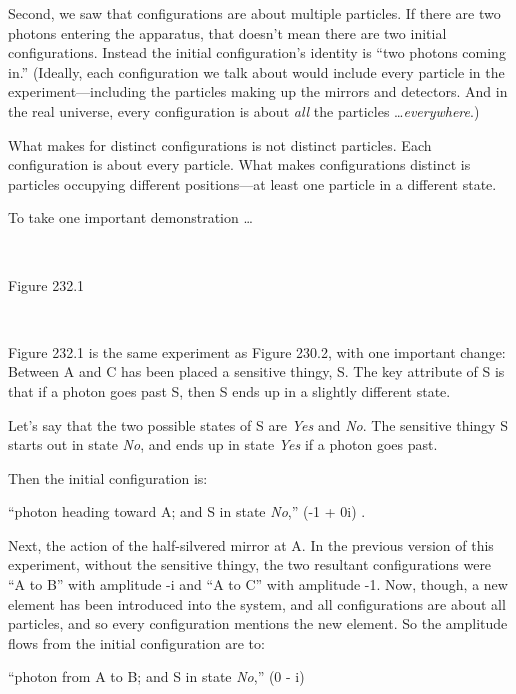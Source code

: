 {
 Second, we saw that configurations are about multiple particles.
If there are two photons entering the apparatus, that
doesn't mean there are two initial configurations.
Instead the initial configuration's identity is
``two photons coming in.'' (Ideally,
each configuration we talk about would include every particle in the
experiment---including the particles making up the mirrors and
detectors. And in the real universe, every configuration is about
\textit{all} the particles \ldots \textit{everywhere}.)}

{
 What makes for distinct configurations is not distinct particles.
Each configuration is about every particle. What makes configurations
distinct is particles occupying different positions---at least one
particle in a different state.}

{
 To take one important demonstration \ldots}

{
 ~}

{\centering
{}
 \newline
 Figure 232.1
\par}


\bigskip

{
 ~}

{
 Figure 232.1 is the same experiment as Figure 230.2, with one
important change: Between A and C has been placed a sensitive thingy,
S. The key attribute of S is that if a photon goes past S, then S ends
up in a slightly different state.}

{
 Let's say that the two possible states of S are
\textit{Yes} and \textit{No}. The sensitive thingy S starts out in
state \textit{No}, and ends up in state \textit{Yes} if a photon goes
past.}

{
 Then the initial configuration is:}

{
 ``photon heading toward A; and S in state
\textit{No},'' (-1 + 0i) .}

{
 Next, the action of the half-silvered mirror at A. In the previous
version of this experiment, without the sensitive thingy, the two
resultant configurations were ``A to
B'' with amplitude -i and ``A to
C'' with amplitude -1. Now, though, a new element has
been introduced into the system, and all configurations are about all
particles, and so every configuration mentions the new element. So the
amplitude flows from the initial configuration are to:}

{
 ``photon from A to B; and S in state
\textit{No},'' (0 - i)}


